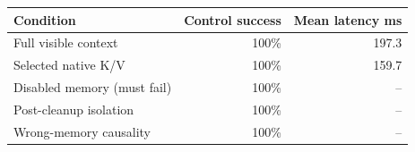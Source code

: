 \begin{tabular}{lrr}
\toprule
Condition & Control success & Mean latency ms \\
\midrule
Full visible context & 100\% & 197.3 \\
Selected native K/V & 100\% & 159.7 \\
Disabled memory (must fail) & 100\% & -- \\
Post-cleanup isolation & 100\% & -- \\
Wrong-memory causality & 100\% & -- \\
\bottomrule
\end{tabular}

